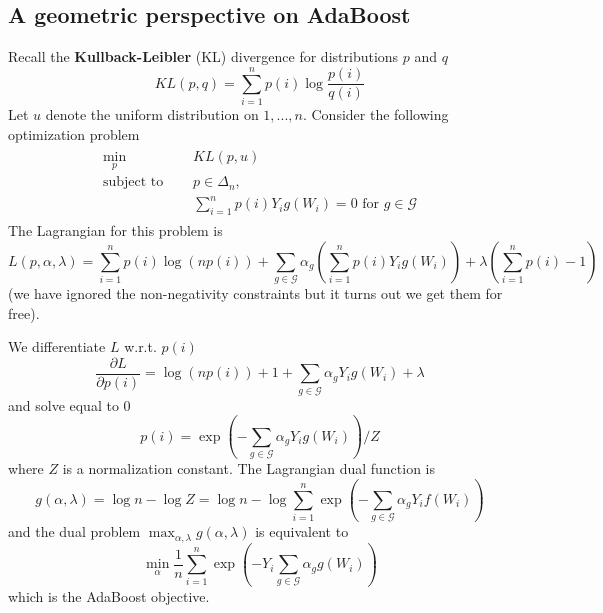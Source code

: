 \subsection{A geometric perspective on AdaBoost}
Recall the \textbf{Kullback-Leibler} (KL) divergence for distributions $p$ and $q$
\begin{equation*}
	KL(p, q) = \sum_{i=1}^n p(i) \log \frac{p(i)}{q(i)}
\end{equation*}
Let $u$ denote the uniform distribution on $1, ..., n$. Consider the following optimization problem
\begin{align*}
	\begin{aligned}
		\min_p\quad   & KL(p, u)\\
		\text{subject to }\quad & p\in \Delta_n, \\
								& \sum_{i=1}^n p(i)Y_i g(W_i) = 0 \text{ for } g \in \mathcal{G}
	\end{aligned}
\end{align*}
The Lagrangian for this problem is
\begin{equation*}
	L(p, \alpha, \lambda) = \sum_{i=1}^n p(i) \log (np(i)) + \sum_{g \in \mathcal{G}} \alpha_g \left( \sum_{i=1}^n p(i)Y_i g(W_i) \right) + \lambda \left(\sum_{i=1}^n p(i) - 1\right) 
\end{equation*}
(we have ignored the non-negativity constraints but it turns out we get them for free).

We differentiate $L$ w.r.t. $p(i)$
\begin{equation*}
	\frac{\partial L}{\partial p(i)} = \log(np(i)) + 1 + \sum_{g \in \mathcal{G}} \alpha_g Y_i g(W_i) + \lambda
\end{equation*}
and solve equal to 0
\begin{equation*}
	p(i) = \exp \left( - \sum_{g \in \mathcal{G}} \alpha_g Y_i g(W_i) \right)/Z
\end{equation*}
where $Z$ is a normalization constant.
The Lagrangian dual function is
\begin{equation*}
	g(\alpha, \lambda) = \log n - \log Z = \log n - \log \sum_{i=1}^n \exp \left( - \sum_{g \in \mathcal{G}} \alpha_g Y_i f(W_i) \right)
\end{equation*}
and the dual problem $\max_{\alpha, \lambda} g(\alpha, \lambda)$ is equivalent to
\begin{equation*}
	\min_\alpha \frac{1}{n}\sum_{i=1}^n \exp\left( - Y_i \sum_{g \in \mathcal{G}} \alpha_g g(W_i)\right)
\end{equation*}
which is the AdaBoost objective.

